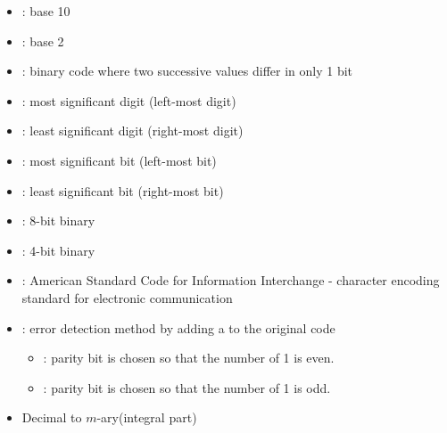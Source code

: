 \begin{multicols}{3}

    \begin{itemize}
      \item {}: base 10
      \item {}: base 2
      \item {}: binary code where two successive
        values differ in only 1 bit
      \item {}: most significant digit (left-most digit)
      \item {}: least significant digit (right-most digit)
      \item {}: most significant bit (left-most bit)
      \item {}: least significant bit (right-most bit)
      \item {}: 8-bit binary
      \item {}: 4-bit binary
      \item {}: American Standard Code for Information Interchange
        - character encoding standard for electronic communication
      \item {}: error detection method by adding a
         to the original code
        \begin{itemize}
          \item {}: parity bit is chosen so that the number of 1 is even.
          \item {}: parity bit is chosen so that the number of 1 is odd.
        \end{itemize}
    \end{itemize}

    \begin{itemize}
      \item{Decimal to $m$-ary(integral part)}
        


\end{itemize}
\end{multicols}
